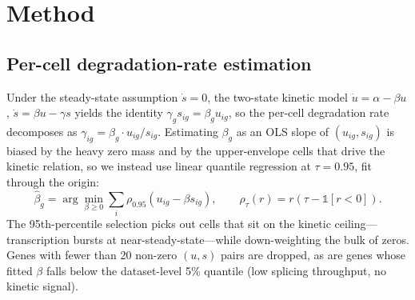 \documentclass{article}
\begin{document}
\section{Method}
\label{sec:method}

\subsection{Per-cell degradation-rate estimation}
\label{sec:estimator}

Under the steady-state assumption $\dot{s}{=}0$, the two-state kinetic model $\dot{u}{=}\alpha{-}\beta u$, $\dot{s}{=}\beta u{-}\gamma s$ yields the identity $\gamma_g s_{ig} {=} \beta_g u_{ig}$, so the per-cell degradation rate decomposes as $\gamma_{ig} {=} \beta_g \cdot u_{ig}/s_{ig}$. Estimating $\beta_g$ as an OLS slope of $(u_{ig}, s_{ig})$ is biased by the heavy zero mass and by the upper-envelope cells that drive the kinetic relation, so we instead use linear quantile regression at $\tau{=}0.95$, fit through the origin:
\begin{equation}
  \widehat{\beta}_g = \arg\min_{\beta \geq 0} \sum_i \rho_{0.95}(u_{ig} - \beta s_{ig}), \qquad \rho_\tau(r) = r(\tau - \mathbb{1}[r < 0]).
  \label{eq:beta}
\end{equation}
The 95th-percentile selection picks out cells that sit on the kinetic ceiling---transcription bursts at near-steady-state---while down-weighting the bulk of zeros. Genes with fewer than 20 non-zero $(u, s)$ pairs are dropped, as are genes whose fitted $\beta$ falls below the dataset-level 5\% quantile (low splicing throughput, no kinetic signal).
\end{document}

